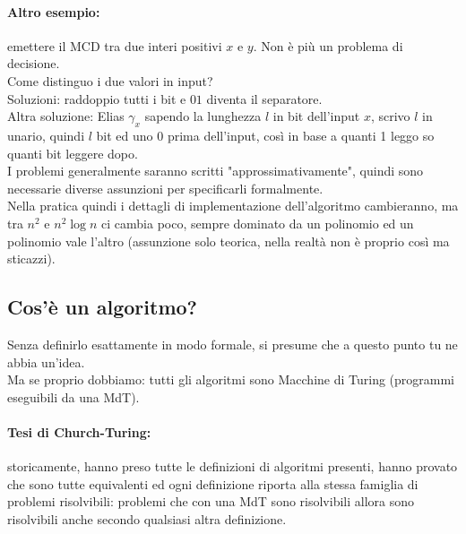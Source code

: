 \documentclass[11pt]{article}
\begin{document}
	\newpage
	
	\paragraph{Altro esempio:} emettere il MCD tra due interi positivi $x$ e $y$. Non è più un problema di decisione.\\
	
	Come distinguo i due valori in input?  \\
	
	Soluzioni: raddoppio tutti i bit e $01$ diventa il separatore. \\
	
	Altra soluzione: Elias $\gamma_x$ sapendo la lunghezza $l$ in bit dell'input $x$, scrivo $l$ in unario, quindi $l$ bit ed uno $0$ prima dell'input, così in base a quanti 1 leggo so quanti bit leggere dopo.  \\
	
	I problemi generalmente saranno scritti "approssimativamente", quindi sono necessarie diverse assunzioni per specificarli formalmente.\\
	
	Nella pratica quindi i dettagli di implementazione dell'algoritmo cambieranno, ma tra $n^2$ e $n^2 \log n$ ci cambia poco, sempre dominato da un polinomio ed un polinomio vale l'altro (assunzione solo teorica, nella realtà non è proprio così ma sticazzi).
	
	\newpage
	
	\subsection{Cos'è un algoritmo?}
	Senza definirlo esattamente in modo formale, si presume che a questo punto tu ne abbia un'idea.\\
	
	Ma se proprio dobbiamo: tutti gli algoritmi sono Macchine di Turing (programmi eseguibili da una MdT). \\
	
	\paragraph{Tesi di Church-Turing:} storicamente, hanno preso tutte le definizioni di algoritmi presenti, hanno provato che sono tutte equivalenti ed ogni definizione riporta alla stessa famiglia di problemi risolvibili: problemi che con una MdT sono risolvibili allora sono risolvibili anche secondo qualsiasi altra definizione.\\
	
\end{document}
